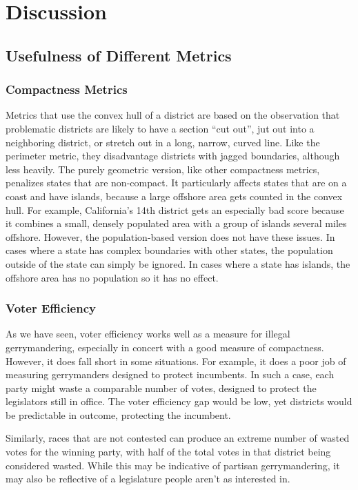 \documentclass[12pt]{article}
\begin{document}
  \section{Discussion}
  \subsection{Usefulness of Different Metrics}
  \subsubsection{Compactness Metrics}
  Metrics that use the convex hull of a district are based on the observation that problematic districts are likely to have a section ``cut out'', jut out into a neighboring district, or stretch out in a long, narrow, curved line. Like the perimeter metric, they disadvantage districts with jagged boundaries, although less heavily. The purely geometric version, like other compactness metrics, penalizes states that are non-compact. It particularly affects states that are on a coast and have islands, because a large offshore area gets counted in the convex hull. For example, California's 14th district gets an especially bad score because it combines a small, densely populated area with a group of islands several miles offshore. However, the population-based version does not have these issues. In cases where a state has complex boundaries with other states, the population outside of the state can simply be ignored. In cases where a state has islands, the offshore area has no population so it has no effect.

  \subsubsection{Voter Efficiency}
  As we have seen, voter efficiency works well as a measure for illegal gerrymandering, especially in concert with a good measure of compactness.  However, it does fall short in some situations.  For example, it does a poor job of measuring gerrymanders designed to protect incumbents.  In such a case, each party might waste a comparable number of votes, designed to protect the legislators still in office.  The voter efficiency gap would be low, yet districts would be predictable in outcome, protecting the incumbent.

  Similarly, races that are not contested can produce an extreme number of wasted votes for the winning party, with half of the total votes in that district being considered wasted.  While this may be indicative of partisan gerrymandering, it may also be reflective of a legislature people aren't as interested in.
\end{document}
